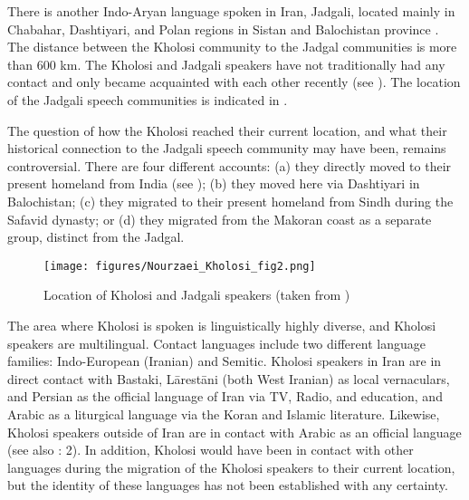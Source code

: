 \documentclass[output=paper,colorlinks,citecolor=brown]{langscibook}
\begin{document}
There is another Indo-Aryan language spoken in Iran, Jadgali, located mainly in Chabahar, Dashtiyari, and Polan regions in Sistan and Balochistan province \citep{barjasteh_delforooz_sociolinguistic_2008}. The distance between the Kholosi community to the Jadgal communities is more than 600 km. The Kholosi and Jadgali speakers have not traditionally had any contact and only became acquainted with each other recently (see \citealt{nourzaei_orality_2023}). The location of the Jadgali speech communities is indicated in .

The question of how the Kholosi reached their current location, and what their historical connection to the Jadgali speech community may have been, remains controversial. There are four different accounts: (a) they directly moved to their present homeland from India (see \citealt{anonby_shipwrecked_2016}); (b) they moved here via Dashtiyari in Balochistan; (c) they migrated to their present homeland from Sindh during the Safavid dynasty; or (d) they migrated from the Makoran coast as a separate group, distinct from the Jadgal. 

\begin{figure}
 \texttt{[image: figures/Nourzaei\_Kholosi\_fig2.png]}
 \caption{Location of Kholosi and Jadgali speakers (taken from \citealt{nourzaei_orality_2023})}
 \label{Kholosi:fig:2}
\end{figure}

The area where Kholosi is spoken is linguistically highly diverse, and Kholosi speakers are multilingual. Contact languages include two different language families: Indo-European (Iranian) and Semitic. Kholosi speakers in Iran are in direct contact with Bastaki, Lārestāni (both West Iranian) as local vernaculars, and Persian as the official language of Iran via TV, Radio, and education, and Arabic as a liturgical language via the Koran and Islamic literature. Likewise, Kholosi speakers outside of Iran are in contact with Arabic as an official language (see also \citealt{anonby_shipwrecked_2016}: 2). In addition, Kholosi would have been in contact with other languages during the migration of the Kholosi speakers to their current location, but the identity of these languages has not been established with any certainty. 
\end{document}
